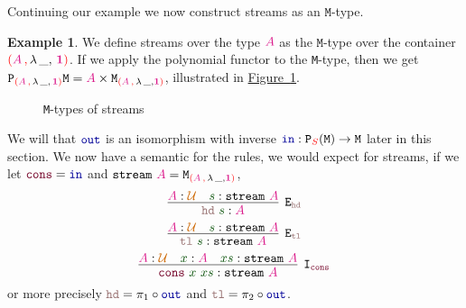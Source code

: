\documentclass[twoside,11pt,openright]{report}
\theoremstyle{plain} %
\theoremstyle{definition}
\newtheorem{exmp}{Example} %
\theoremstyle{remark}
\newcommand*{\figref}[1]{\hyperref[fig:#1]{Figure~\ref*{fig:#1}}}
\newcommand*{\term}[1]{\textcolor{green!30!black}{#1}} %
\newcommand*{\type}[1]{\textcolor{magenta!90!black}{#1}}
\newcommand*{\container}[1]{\textcolor{red}{#1}}
\newcommand*{\containerpair}[2]{\ensuremath{\colorlet{savedleftcolor}{.}\color{red}\left(\color{savedleftcolor}#1\,\textcolor{red}{\mathbf{,}}\,#2\color{red}\right)\color{savedleftcolor}}}
\newcommand*{\containerpairsimple}[2]{\containerpair{#1}{\lambda\,\_,\,#2}}
\newcommand*{\universe}[1]{\textcolor{orange!80!black}{#1}}
\newcommand*{\unit}{\type{\textbf{1}}}
\newcommand*{\function}[1]{\textcolor{blue!60!black}{\ensuremath{\mathtt{#1}}}}
\newcommand*{\constructor}[1]{\textcolor{purple!60!black}{\ensuremath{\mathtt{#1}}}}
\newcommand*{\destructor}[1]{\textcolor{pink!60!black}{\ensuremath{\mathtt{#1}}}}
\newcommand*{\typeformer}[1]{\ensuremath{\mathtt{#1}}}
\newcommand*{\functor}[1]{\ensuremath{\mathbf{\mathtt{#1}}}}
\begin{document}
\noindent Continuing our example we now construct streams as an \(\mathtt{M}\)-type.
\begin{exmp} We define streams over the type \(\type{A}\) as the \(\mathtt{M}\)-type over the container \(\containerpairsimple{\type{A}}{\unit}\). If we apply the polynomial functor to the \texttt{M}-type, then we get \(\functor{P}_{\containerpairsimple{\type{A}}{\unit}} \typeformer{M} = \type{A} \times \typeformer{M}_{\containerpair{\type{A}}{\lambda\,\_,\unit}}\), illustrated in \figref{stream-M-type}.
  \begin{figure}[h]
    \centering
    \caption{\texttt{M}-types of streams}
    \label{fig:stream-M-type}
  \end{figure}
  We will that \(\function{out}\) is an isomorphism with inverse \(\function{in} : \functor{P}_{\container{S}}(\typeformer{M}) \rightarrow \typeformer{M}\) later in this section. We now have a semantic for the rules, we would expect for streams, if we let \(\constructor{cons} = \function{in}\) and \(\typeformer{stream}~\type{A} = \typeformer{M}_{\containerpair{\type{A}}{\lambda\,\_,\unit}}\),
  \begin{equation}
    \vcenter{\infer[\mathtt{E}_{\destructor{hd}}]{\destructor{hd}~\term{s} : \type{A}}{\type{A} : \universe{\mathcal{U}} & \term{s} : \typeformer{stream}~\type{A}}}
  \end{equation}
  \begin{equation}
    \vcenter{\infer[\mathtt{E}_{\destructor{tl}}]{\destructor{tl}~\term{s} : \typeformer{stream}~\type{A}}{\type{A} : \universe{\mathcal{U}} & \term{s} : \typeformer{stream}~\type{A}}}
  \end{equation}
  \begin{equation}
    \vcenter{\infer[\mathtt{I}_{\constructor{cons}}]{\term{\constructor{cons}}~\term{x}~\term{xs} : \typeformer{stream}~\type{A}}{\type{A} : \universe{\mathcal{U}} & \term{x} : \type{A} & \term{xs} : \typeformer{stream}~\type{A}}}
  \end{equation}
  or more precisely \(\destructor{hd} = \pi_1 \circ \function{out}\) and \(\destructor{tl} = \pi_2 \circ \function{out}\).
\end{exmp}
\end{document}
